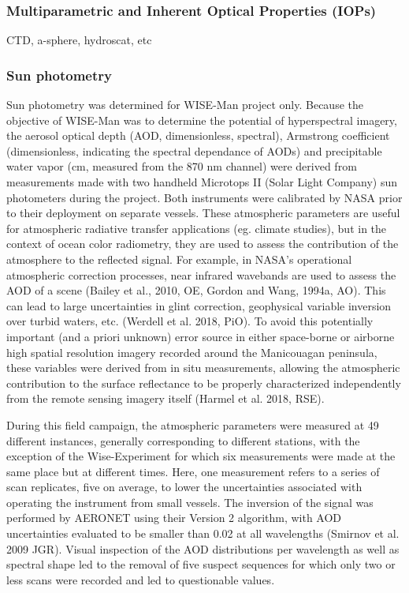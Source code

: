 \documentclass[essd, manuscript]{copernicus}
\begin{document}
\subsubsection{Multiparametric and Inherent Optical Properties (IOPs)}
CTD, a-sphere, hydroscat, etc

\subsubsection{Sun photometry}
Sun photometry was determined for WISE-Man project only. Because the objective of WISE-Man was to determine the potential of hyperspectral imagery, the aerosol optical depth (AOD, dimensionless, spectral), Armstrong coefficient (dimensionless, indicating the spectral dependance of AODs) and precipitable water vapor (cm, measured from the 870 nm channel) were derived from measurements made with two handheld Microtops II (Solar Light Company) sun photometers during the project. Both instruments were calibrated by NASA prior to their deployment on separate vessels. These atmospheric parameters are useful for atmospheric radiative transfer applications (eg. climate studies), but in the context of ocean color radiometry, they are used to assess the contribution of the atmosphere to the reflected signal. For example, in NASA’s operational atmospheric correction processes, near infrared wavebands are used to assess the AOD of a scene (Bailey et al., 2010, OE, Gordon and Wang, 1994a, AO). This can lead to large uncertainties in glint correction, geophysical variable inversion over turbid waters, etc. (Werdell et al. 2018, PiO). To avoid this potentially important (and a priori unknown) error source in either space-borne or airborne high spatial resolution imagery recorded around the Manicouagan peninsula, these variables were derived from in situ measurements, allowing the atmospheric contribution to the surface reflectance to be properly characterized independently from the remote sensing imagery itself (Harmel et al. 2018, RSE).
 
During this field campaign, the atmospheric parameters were measured at 49 different instances, generally corresponding to different stations, with the exception of the Wise-Experiment for which six measurements were made at the same place but at different times. Here, one measurement refers to a series of scan replicates, five on average, to lower the uncertainties associated with operating the instrument from small vessels. The inversion of the signal was performed by AERONET using their Version 2 algorithm, with AOD uncertainties evaluated to be smaller than 0.02 at all wavelengths (Smirnov et al. 2009 JGR). Visual inspection of the AOD distributions per wavelength as well as spectral shape led to the removal of five suspect sequences for which only two or less scans were recorded and led to questionable values. 
\end{document}
